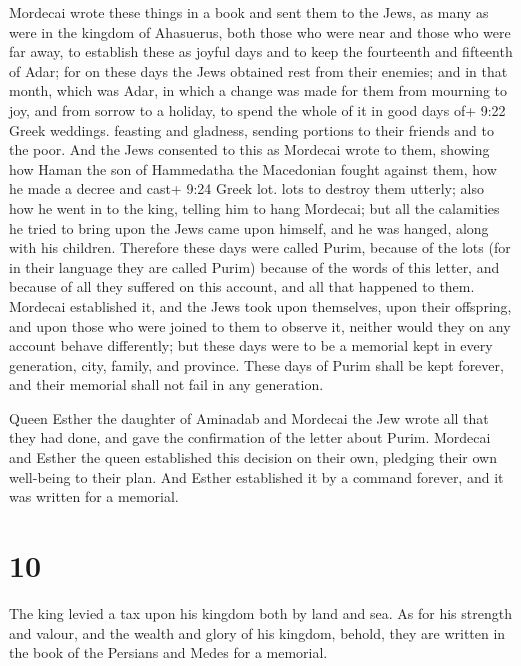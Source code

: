  Mordecai wrote these things in a book and sent them to the
Jews, as many as were in the kingdom of Ahasuerus, both those who were
near and those who were far away,  to establish these as
joyful days and to keep the fourteenth and fifteenth of Adar;
 for on these days the Jews obtained rest from their
enemies; and in that month, which was Adar, in which a change was made
for them from mourning to joy, and from sorrow to a holiday, to spend
the whole of it in good days of+ 9:22 Greek weddings. feasting and
gladness, sending portions to their friends and to the poor.
 And the Jews consented to this as Mordecai wrote to them,
 showing how Haman the son of Hammedatha the Macedonian
fought against them, how he made a decree and cast+ 9:24 Greek lot. lots
to destroy them utterly;  also how he went in to the king,
telling him to hang Mordecai; but all the calamities he tried to bring
upon the Jews came upon himself, and he was hanged, along with his
children.  Therefore these days were called Purim, because
of the lots (for in their language they are called Purim) because of the
words of this letter, and because of all they suffered on this account,
and all that happened to them.  Mordecai established it,
and the Jews took upon themselves, upon their offspring, and upon those
who were joined to them to observe it, neither would they on any account
behave differently; but these days were to be a memorial kept in every
generation, city, family, and province.  These days of
Purim shall be kept forever, and their memorial shall not fail in any
generation.

 Queen Esther the daughter of Aminadab and Mordecai the Jew
wrote all that they had done, and gave the confirmation of the letter
about Purim.  Mordecai and Esther the queen established
this decision on their own, pledging their own well-being to their plan.
 And Esther established it by a command forever, and it was
written for a memorial.

\hypertarget{section-9}{%
\section{10}\label{section-9}}

 The king levied a tax upon his kingdom both by land and
sea.  As for his strength and valour, and the wealth and
glory of his kingdom, behold, they are written in the book of the
Persians and Medes for a memorial.

